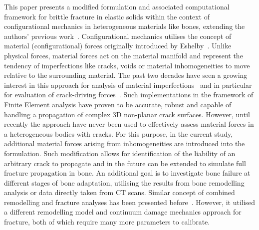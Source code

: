 \documentclass[11pt]{acmeArticle}
\numberwithin{equation}{section}
\begin{document}
This paper presents a modified formulation and associated computational framework for brittle fracture in elastic solids within the context of configurational mechanics in heterogeneous materials like bones, extending the authors' previous work~\citep{kaczmarczyk2017energy}. 
Configurational mechanics utilises the concept of material (configurational) forces originally introduced by Eshelby~\citep{eshelby1951force}. 
Unlike physical forces, material forces act on the material manifold and represent the tendency of imperfections like cracks, voids or material inhomogeneities to move relative to the surrounding material. 
The past two decades have seen a growing interest in this approach for analysis of material imperfections~\citep{maugin2016configurational} and in particular for evaluation of crack-driving forces~\citep{steinmann2001application, ozencc2016configurational, kaczmarczyk2017energy}. 
Such implementations in the framework of Finite Element analysis have proven to be accurate, robust and capable of handling a propagation of complex 3D non-planar crack surfaces. However, until recently the approach have never been used to effectively assess material forces in a heterogeneous bodies with cracks. 
For this purpose, in the current study, additional material forces arising from inhomogeneities are introduced into the formulation. Such modification allows for identification of the liability of an arbitrary crack to propagate and in the future can be extended to simulate full fracture propagation in bone. 
An additional goal is to investigate bone failure at different stages of bone adaptation, utilising the results from bone remodelling analysis or data directly taken from CT scans. 
Similar concept of combined remodelling and fracture analyses has been presented before~\citep{hambli2013integrated}. 
However, it utilised a different remodelling model and continuum damage mechanics approach for fracture, both of which require many more parameters to calibrate. 
\end{document}
